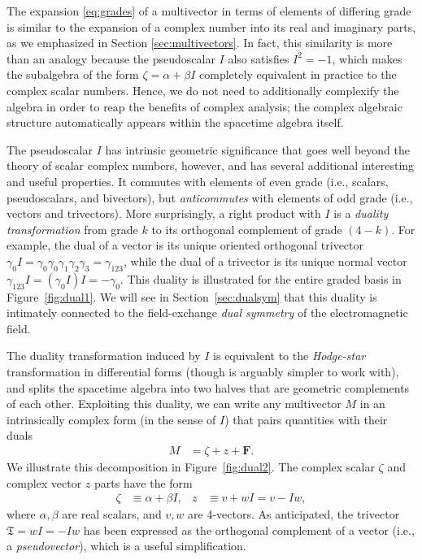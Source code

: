 \documentclass[1p,sort&compress]{elsarticle}
\numberwithin{equation}{section}
\newcommand{\bv}[1]{\mathbf{#1}}
\begin{document}
The expansion \eqref{eq:grades} of a multivector in terms of elements of differing grade is similar to the expansion of a complex number into its real and imaginary parts, as we emphasized in Section \ref{sec:multivectors}.  In fact, this similarity is more than an analogy because the pseudoscalar $I$ also satisfies $I^2 = -1$, which makes the subalgebra of the form $\zeta = \alpha + \beta I$ completely equivalent in practice to the complex scalar numbers.  Hence, we do not need to additionally complexify the algebra in order to reap the benefits of complex analysis; the complex algebraic structure automatically appears within the spacetime algebra itself.  

The pseudoscalar $I$ has intrinsic geometric significance that goes well beyond the theory of scalar complex numbers, however, and has several additional interesting and useful properties.  It commutes with elements of even grade (i.e., scalars, pseudoscalars, and bivectors), but \emph{anticommutes} with elements of odd grade (i.e., vectors and trivectors).  More surprisingly, a right product with $I$ is a \emph{duality transformation} from grade $k$ to its orthogonal complement of grade $(4-k)$.  For example, the dual of a vector is its unique oriented orthogonal trivector $\gamma_0 I = \gamma_0\gamma_0\gamma_1\gamma_2\gamma_3 = \gamma_{123}$, while the dual of a trivector is its unique normal vector $\gamma_{123}I = (\gamma_0 I)I = -\gamma_0$.  This duality is illustrated for the entire graded basis in Figure~\ref{fig:dual1}.  We will see in Section~\ref{sec:dualsym} that this duality is intimately connected to the field-exchange \emph{dual symmetry} of the electromagnetic field.

The duality transformation induced by $I$ is equivalent to the \emph{Hodge-star} transformation in differential forms (though is arguably simpler to work with), and splits the spacetime algebra into two halves that are geometric complements of each other.  Exploiting this duality, we can write any multivector $M$ in an intrinsically complex form (in the sense of $I$) that pairs quantities with their duals
\begin{align}\label{eq:dual}
  M &= \zeta + z + \bv{F}.
\end{align}
We illustrate this decomposition in Figure~\ref{fig:dual2}.  The complex scalar $\zeta$ and complex vector $z$ parts have the form 
\begin{align}
  \zeta &\equiv \alpha + \beta I, & z &\equiv v + w I = v - I w,
\end{align}
where $\alpha,\beta$ are real scalars, and $v,w$ are 4-vectors.  As anticipated, the trivector $\mathfrak{T} = w I = - I w$ has been expressed as the orthogonal complement of a vector (i.e., a \emph{pseudovector}), which is a useful simplification.  
\end{document}
